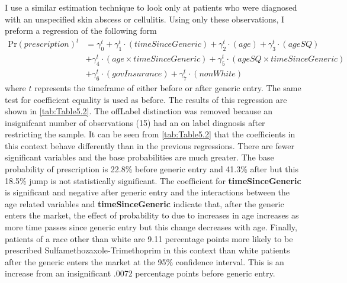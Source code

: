 \newpage
I use a similar estimation technique to look only at patients who were diagnosed with an unspecified skin abscess or cellulitis. Using only these observations, I preform a regression of the following form
\begin{equation}
\begin{split}
    \text{Pr}(prescription)^t & = \gamma^t_0 + \gamma^t_1\cdot(timeSinceGeneric)+ \gamma_2^t\cdot(age) + \gamma_3^t\cdot(ageSQ)\\
    &  + \gamma_4^t\cdot(age\times timeSinceGeneric)+ \gamma_5^t\cdot(ageSQ\times timeSinceGeneric)\\
    & + \gamma_6^t\cdot(govInsurance) + \gamma_7^t\cdot(nonWhite)
\end{split}
\end{equation}
where $t$ represents the timeframe of either before or after generic entry. The same test for coefficient equality is used as before. The results of this regression are shown in \autoref{tab:Table5.2}. The offLabel distinction was removed because an insignifcant number of observations (15) had an on label diagnosis after restricting the sample.
\indent It can be seen from \autoref{tab:Table5.2} that the coefficients in this context behave differently than in the previous regressions. There are fewer significant variables and the base probabilities are much greater. The base probability of prescription is 22.8\% before generic entry and 41.3\% after but this 18.5\% jump is not statistically significant. The coefficient for \textbf{timeSinceGeneric} is significant and negative after generic entry and the interactions between the age related variables and \textbf{timeSinceGeneric} indicate that, after the generic enters the market, the effect of probability to due to increases in age increases as more time passes since generic entry but this change decreases with age. Finally, patients of a race other than white are 9.11 percentage points more likely to be prescribed Sulfamethozaxole-Trimethoprim in this context than white patients after the generic enters the market at the 95\% confidence interval. This is an increase from an insignificant .0072 percentage points before generic entry.

